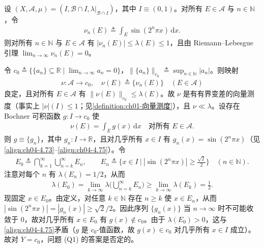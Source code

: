 \documentclass[../../main.tex]{subfiles}%
\begin{document}
\begin{example}\label{example:ch04-c0反例}
设 $(X,\mathcal{A},\mu)=(I,\mathcal{B}\cap I,\lambda|_{\mathcal{B}\cap I})$，其中 $I\equiv(0,1)$。对所有 $E\in\mathcal{A}$ 与 $n\in\mathbb{N}$，令
\begin{align}
\nu_n(E)\triangleq \int_E\sin(2^n\pi x)\,\mathrm{d}x. \label{align:ch04-4.73}
\end{align}
则对所有 $n\in\mathbb{N}$ 与 $E\in\mathcal{A}$ 有 $|\nu_n(E)|\leqslant\lambda(E)\leqslant1$，且由 Riemann--Lebesgue 引理 $\lim_{n\to\infty}\nu_n(E)=0$。

令 $c_0\triangleq \{\{a_n\}\subseteq\mathbb{R}\mid\lim_{n\to\infty}a_n=0\}$，$\|\{a_n\}\|_{c_0}\triangleq \sup_{n\in\mathbb{N}}|a_n|$。则映射
\begin{align}
\nu:\mathcal{A}\to c_0,\quad \nu(E)\triangleq \{\nu_n(E)\}\quad(E\in\mathcal{A}) \label{align:ch04-4.74}
\end{align}
良定，且对所有 $E\in\mathcal{A}$ 有 $\|\nu(E)\|_{c_0}\leqslant\lambda(E)$。故 $\nu$ 是有有界变差的向量测度（事实上 $|\nu|(I)\leqslant1$；见\cref{definition:ch01-向量测度}），且 $\nu\ll\lambda$。设存在 Bochner 可积函数 $g:I\to c_0$ 使
\begin{align}
\nu(E)=\int_E g(x)\,\mathrm{d}x\quad\text{对所有 }E\in\mathcal{A}. \label{align:ch04-4.75}
\end{align}
则 $g\equiv\{g_n\}$，其中 $g_n:I\to\mathbb{R}$，且对几乎所有 $x\in I$ 有 $g_n(x)=\sin(2^n\pi x)$（见\eqref{align:ch04-4.73}--\eqref{align:ch04-4.75}）。令
\begin{align*}
E_0\triangleq \bigcap_{k=1}^\infty\bigcup_{n=k}^\infty E_n,\qquad E_n\triangleq \Big\{x\in I\ \Big|\ |\sin(2^n\pi x)|\geqslant\frac{\sqrt2}{2}\Big\}\quad(n\in\mathbb{N}).
\end{align*}
注意对每个 $n$ 有 $\lambda(E_n)=1/2$，从而
\begin{align*}
\lambda(E_0)=\lim_{k\to\infty}\lambda\Big(\bigcup_{n=k}^\infty E_n\Big)\geqslant\lim_{k\to\infty}\lambda(E_k)=\frac12.
\end{align*}
现固定 $x\in E_0$。由定义，对任意 $k\in\mathbb{N}$ 存在 $n\geqslant k$ 使 $x\in E_n$，从而 $|\sin(2^n\pi x)|=|g_n(x)|\geqslant\sqrt2/2$。因此序列 $\{g_n(x)\}$ 当 $n\to\infty$ 时不可能收敛于 $0$，故对几乎所有 $x\in E_0$ 有 $g(x)\notin c_0$。由于 $\lambda(E_0)>0$，这与\eqref{align:ch04-4.75}矛盾（$g$ 是 $c_0$-值函数，故 $g(x)\in c_0$ 对几乎所有 $x\in I$ 成立）。故对 $Y=c_0$，问题 (Q1) 的答案是否定的。
\end{example}
\end{document}
